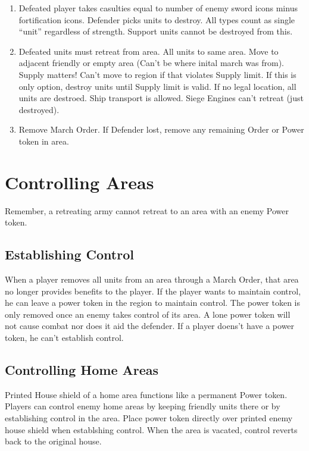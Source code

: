 \documentclass[12pt]{article}
\newenvironment{enumerateCustom}
{\begin{enumerate}
  \setlength{\itemsep}{1pt}
  \setlength{\parskip}{0pt}
  \setlength{\parsep}{0pt}}
{\end{enumerate}}
\begin{document}
\begin{multicols*}{2}
\begin{enumerateCustom}
\begin{enumerateCustom}
		\item Defeated player takes casulties equal to number of enemy sword icons minus fortification icons. Defender picks units to destroy. All types count as single ``unit'' regardless of strength. Support units cannot be destroyed from this.
		\item Defeated units must retreat from area. All units to same area. Move to adjacent friendly or empty area (Can't be where inital march was from). Supply matters! Can't move to region if that violates Supply limit. If this is only option, destroy units until Supply limit is valid. If no legal location, all units are destroed. Ship transport is allowed. Siege Engines can't retreat (just destroyed).
		\item Remove March Order. If Defender lost, remove any remaining Order or Power token in area.
	\end{enumerateCustom}
\end{enumerateCustom}

\section*{Controlling Areas}
Remember, a retreating army cannot retreat to an area with an enemy Power token.
\subsection*{Establishing Control}
When a player removes all units from an area through a March Order, that area no longer provides benefits to the player. If the player wants to maintain control, he can leave a power token in the region to maintain control. The power token is only removed once an enemy takes control of its area. A lone power token will not cause combat nor does it aid the defender. If a player doens't have a power token, he can't establish control.
\subsection*{Controlling Home Areas}
Printed House shield of a home area functions like a permanent Power token. Players can control enemy home areas by keeping friendly units there or by establishing control in the area. Place power token directly over printed enemy house shield when establshing control. When the area is vacated, control reverts back to the original house.


\end{multicols*}
\end{document}
